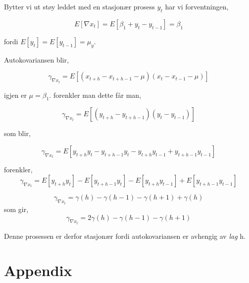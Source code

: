 \documentclass[10pt]{article}
\begin{document}
{Bytter vi ut støy leddet med en stasjonær prosess $y_{t}$ har vi forventningen,

\begin{equation*}
  E[\nabla x_{t}] = E[\beta_{1} + y_{t} - y_{t-1}] = \beta_{1}
\end{equation*}

fordi $E[y_{t}] = E[y_{t-1}] = \mu_{y}$.

Autokovariansen blir,

  \begin{equation*}
  \gamma_{\nabla x_{t}} = E[(x_{t+h} - x_{t+h - 1} - \mu)(x_{t} - x_{t- 1} - \mu)]
\end{equation*}

igjen er $\mu = \beta_{1}$. forenkler man dette får man,

  \begin{equation*}
  \gamma_{\nabla x_{t}} = E[(y_{t+h} - y_{t+h-1})(y_{t} - y_{t-1})]
\end{equation*}

som blir,

   \begin{equation*}
  \gamma_{\nabla x_{t}} = E[y_{t+h}y_{t} - y_{t+h-1}y_{t} - y_{t+h}y_{t-1} + y_{t+h-1}y_{t-1}]
\end{equation*}

forenkler,
\begin{equation*}
  \gamma_{\nabla x_{t}} = E[y_{t+h}y_{t}] - E[y_{t+h-1}y_{t}] - E[y_{t+h}y_{t-1}] + E[y_{t+h-1}y_{t-1}]
\end{equation*}

\begin{equation*}
  \gamma_{\nabla x_{t}} = \gamma(h) - \gamma(h - 1) - \gamma(h + 1) + \gamma(h)
\end{equation*}
som gir,
\begin{equation*}
  \gamma_{\nabla x_{t}} = 2\gamma(h) - \gamma(h - 1) - \gamma(h + 1)
\end{equation*}

Denne prosessen er derfor stasjonær fordi autokovariansen er avhengig av \emph{lag} h.







\newpage
\section{Appendix}
}
\end{document}
